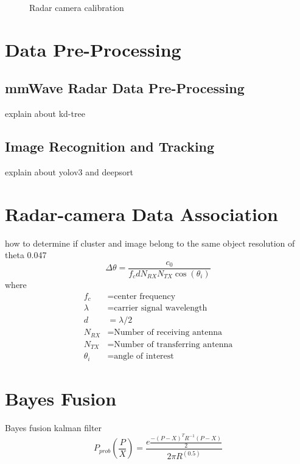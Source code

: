 \begin{figure}[hbpt]
    \caption{Radar camera calibration}
    \label{fig:radar_camera_calibration}
\end{figure}

\section{Data Pre-Processing}\label{sec:2-preprocessing}
\subsection{mmWave Radar Data Pre-Processing}\label{sec:2-kd_tree}
explain about kd-tree

\subsection{Image Recognition and Tracking}\label{sec:2-img_recognition}
explain about yolov3 and deepsort

\section{Radar-camera Data Association}\label{sec:2-association}
how to determine if cluster and image belong to the same object
resolution of theta 0.047
\begin{equation}\label{equ:angular_resolution}
    \Delta \theta= \frac{c_0}{f_c d N_{RX} N_{TX} \cos(\theta _i)}
\end{equation}
where
\begin{align*}
    f_c & = \text{center frequency} \\
    \lambda & = \text{carrier signal wavelength} \\
    d & =  \lambda/2 \\
    N_{RX} & = \text{Number of receiving antenna}\\
    N_{TX}& = \text{Number of transferring antenna}\\
    \theta _i &= \text{angle of interest}
\end{align*}

\section{Bayes Fusion}\label{sec:2-bayes_fusion}

Bayes fusion kalman filter 
\begin{equation}\label{equ:bayes1}
    P_{prob}(\frac{P}{X})=
    \frac
    {e \frac{−(P−X)^T R^{−1}(P−X)}{2}}
    {2 \pi R^(0.5)}
\end{equation}

